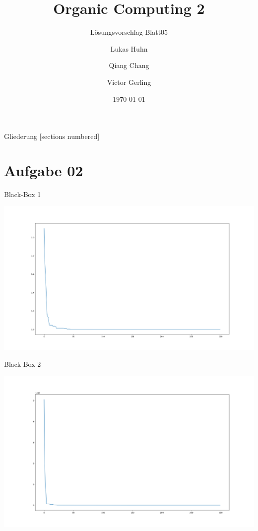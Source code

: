 \documentclass{ocbeameruni}
\title{Organic Computing 2}
\subtitle{Lösungsvorschlag Blatt05}
\date{\today}
\author{Lukas Huhn \and Qiang Chang \and Victor Gerling}
\institute{%
  Universität Augsburg\\
  Institut für Informatik\\
  Lehrstuhl für Organic Computing
}
\begin{document}
\maketitle


\begin{frame}{Gliederung}
  [sections numbered]
  \tableofcontents
\end{frame}

\section{Aufgabe 02}

\begin{frame}{Black-Box 1}
    \begin{center}
    \includegraphics[scale=0.2]{plots/bb1_2.png}
    \end{center}
\end{frame}

\begin{frame}{Black-Box 2}
    \begin{center}
    \includegraphics[scale=0.25]{plots/bb2_2.png}
    \end{center}
\end{frame}
\end{document}
